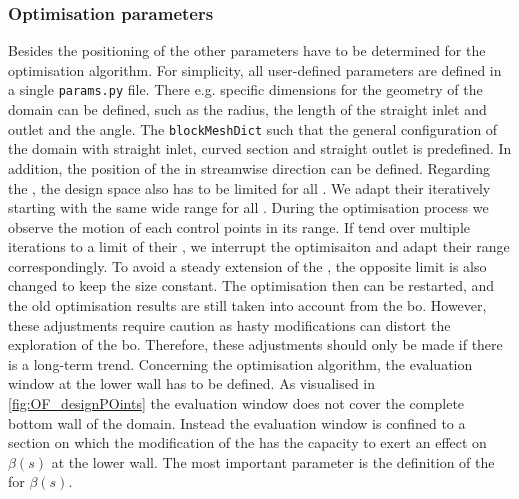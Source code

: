 \subsubsection{Optimisation parameters}

Besides the positioning of the  other parameters have to be determined for the optimisation algorithm.
For simplicity, all user-defined parameters are defined in a single \texttt{params.py} file.
There e.g. specific dimensions for the geometry of the domain can be defined, such as the radius, the length of the straight inlet and outlet and the angle.
The \texttt{blockMeshDict} such that the general configuration of the domain with straight inlet, curved section and straight outlet is predefined.
In addition, the position of the  in streamwise direction can be defined.
Regarding the , the design space also has to be limited for all .
We adapt their  iteratively starting with the same wide range for all .
During the optimisation process we observe the motion of each control points in its range.
If  tend over multiple iterations to a limit of their , we interrupt the optimisaiton and adapt their range correspondingly.
To avoid a steady extension of the , the opposite limit is also changed to keep the  size constant.
The optimisation then can be restarted, and the old optimisation results are still taken into account from the \acrshort{bo}.
However, these adjustments require caution as hasty modifications can distort the exploration of the \acrshort{bo}.
Therefore, these adjustments should only be made if there is a long-term trend.
Concerning the optimisation algorithm, the evaluation window at the lower wall has to be defined.
As visualised in \autoref{fig:OF_designPOints} the evaluation window does not cover the complete bottom wall of the domain.
Instead the evaluation window is confined to a section on which the modification of the  has the capacity to exert an effect on $\beta(s)$ at the lower wall.
The most important parameter is the definition of the  for $\beta(s)$.



